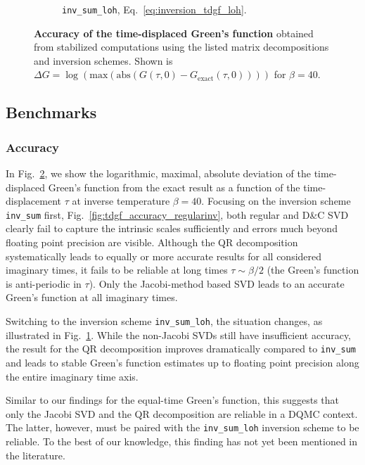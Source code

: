 \documentclass[submission, Phys]{SciPost}
\begin{document}
\begin{figure}
\begin{subfigure}{0.48\textwidth}
		\caption{\texttt{inv\_sum\_loh}, Eq.~\eqref{eq:inversion_tdgf_loh}. \label{fig:tdgf_accuracy_loh}}
	\end{subfigure}
	\vspace{5pt}
	\caption{\textbf{Accuracy of the time-displaced Green's function} obtained from stabilized computations using the listed matrix decompositions and inversion schemes. Shown is $\Delta G = \log(\textrm{max}(\textrm{abs}(G(\tau, 0) - G_{\textrm{exact}}(\tau, 0))))$ for $\beta=40$. \label{fig:tdgf_accuracy}}
\end{figure}

\subsection{Benchmarks}
\subsubsection{Accuracy}

In Fig.~\ref{fig:tdgf_accuracy}, we show the logarithmic, maximal, absolute deviation of the time-displaced Green's function from the exact result as a function of the time-displacement $\tau$ at inverse temperature $\beta=40$. Focusing on the inversion scheme \texttt{inv\_sum} first, Fig.~\ref{fig:tdgf_accuracy_regularinv}, both regular and D\&C SVD clearly fail to capture the intrinsic scales sufficiently and errors much beyond floating point precision are visible. Although the QR decomposition systematically leads to equally or more accurate results for all considered imaginary times, it fails to be reliable at long times $\tau\sim\beta/2$ (the Green's function is anti-periodic in $\tau$). Only the Jacobi-method based SVD leads to an accurate Green's function at all imaginary times.

Switching to the inversion scheme \texttt{inv\_sum\_loh}, the situation changes, as illustrated in Fig.~\ref{fig:tdgf_accuracy_loh}. While the non-Jacobi SVDs still have insufficient accuracy, the result for the QR decomposition improves dramatically compared to \texttt{inv\_sum} and leads to stable Green's function estimates up to floating point precision along the entire imaginary time axis.

Similar to our findings for the equal-time Green's function, this suggests that only the Jacobi SVD and the QR decomposition are reliable in a DQMC context. The latter, however, must be paired with the \texttt{inv\_sum\_loh} inversion scheme to be reliable. To the best of our knowledge, this finding has not yet been mentioned in the literature.
\end{document}
